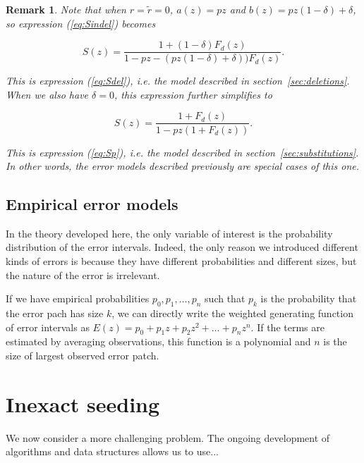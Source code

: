 \documentclass{article}
\newtheorem{remark}{Remark}
\begin{document}
\begin{remark}
Note that when $r = \tilde{r} = 0$, $a(z) = pz$ and $b(z) = pz(1-\delta) +
\delta$, so expression (\ref{eq:Sindel}) becomes

\begin{equation*}
S(z) = \frac{1 + (1-\delta)F_d(z)}{1-pz-(pz(1-\delta)+\delta))F_d(z)}.
\end{equation*}

This is expression (\ref{eq:Sdel}), \textit{i.e.} the model described in
section~\ref{sec:deletions}. When we also have $\delta = 0$, this
expression further simplifies to

\begin{equation*}
S(z) = \frac{1 + F_d(z)}{1-pz(1 + F_d(z))}.
\end{equation*}

This is expression (\ref{eq:Sp}), \textit{i.e.} the model described in
section~\ref{sec:substitutions}. In other words, the error models
described previously are special cases of this one.
\end{remark}




\subsection{Empirical error models}
\label{subsec:empirical}

In the theory developed here, the only variable of interest is the
probability distribution of the error intervals. Indeed, the only reason
we introduced different kinds of errors is because they have different
probabilities and different sizes, but the nature of the error is
irrelevant.

If we have empirical probabilities $p_0, p_1, \ldots, p_n$ such that $p_k$
is the probability that the error pach has size $k$, we can directly write
the weighted generating function of error intervals as $E(z) = p_0 + p_1z
+ p_2z^2 + \ldots + p_nz^n$. If the terms are estimated by averaging
observations, this function is a polynomial and $n$ is the size of largest
observed error patch.




\section{Inexact seeding}

We now consider a more challenging problem. The ongoing development of
algorithms and data structures allows us to use...
\end{document}

